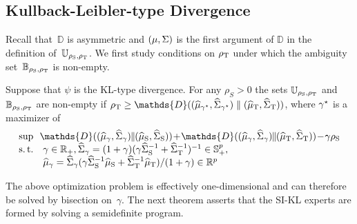 \documentclass{article}
\begin{document}
\subsection{Kullback-Leibler-type Divergence}
Recall that~$\mathds D$ is asymmetric and $(\mu, \Sigma)$ is the first argument of $\mathds D$ in the definition of~$\mathbb U_{\rho_{\rm S}, \rho_{\rm T}}$. We first study conditions on $\rho_{\rm T}$ under which the ambiguity set~$\mathbb B_{\rho_{\rm S}, \rho_{\rm T}}$ is non-empty.
\begin{proposition}
\label{prop:minimum_radius_kl}
Suppose that $\psi$ is the KL-type divergence. For any $\rho_S > 0$ the sets $\mathbb U_{\rho_{\rm S}, \rho_{\rm T}}$ and $\mathbb B_{\rho_{\rm S}, \rho_{\rm T}}$ are non-empty if  $\rho_{\rm T} \ge \mathds{D}((\msa_{\gamma\opt}, \covsa_{\gamma\opt}) \parallel (\msa_{\rm T}, \covsa_{\rm T}))$, where $\gamma^\star$ is a maximizer of
\[
\begin{array}{cl}
\sup & \!\!\mathds{D}((\msa_{\gamma}, \covsa_{\gamma})\!\! \parallel\!\! (\msa_{\rm S}, \covsa_{\rm S}))\!+\! \mathds{D}((\msa_{\gamma}, \covsa_{\gamma}) \!\! \parallel\! \!(\msa_{\rm T}, \covsa_{\rm T}))\!-\!\gamma \rho_{\rm S} \\
\st & \gamma \in \R_+, \covsa_{\gamma} = (1+\gamma) (\gamma \covsa_{\rm S}^{-1} + \covsa_{\rm T}^{-1})^{-1} \in \PSD^p,  \\
& \msa_{\gamma} = \covsa_{\gamma} (\gamma \covsa_{\rm S}^{-1} \msa_{\rm S} + \covsa_{\rm T}^{-1} \msa_{\rm T}) / (1+\gamma) \in \R^p
\end{array}
\]
\end{proposition}
The above optimization problem is effectively  one-dimensional and can therefore be solved by bisection on~$\gamma$. The next theorem asserts that the SI-KL experts are formed by solving a semidefinite program.
\end{document}
